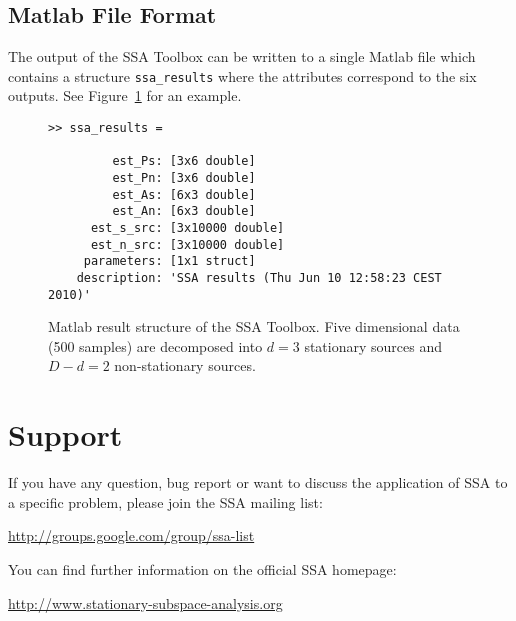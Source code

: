 \documentclass{article}
\newcommand{\1}{\ensuremath{\mathds{1}}}
\newcommand{\0}{\ensuremath{0}}
\begin{document}
\subsection{Matlab File Format}

The output of the SSA Toolbox can be written to a single Matlab file which contains
a structure \texttt{ssa\_results} where the attributes correspond to the six outputs. 
See Figure~\ref{fig:ex_matlab_res} for an example.

\begin{figure}[h]
\centering
\begin{boxedminipage}{12cm}
\begin{verbatim}
>> ssa_results = 

         est_Ps: [3x6 double]
         est_Pn: [3x6 double]
         est_As: [6x3 double]
         est_An: [6x3 double]
      est_s_src: [3x10000 double]
      est_n_src: [3x10000 double]
     parameters: [1x1 struct]
    description: 'SSA results (Thu Jun 10 12:58:23 CEST 2010)'
\end{verbatim}
\end{boxedminipage}
\caption{
Matlab result structure of the SSA Toolbox. Five dimensional data (500 samples) 
are decomposed into $d = 3$ stationary sources and $D-d = 2$ non-stationary sources.
\label{fig:ex_matlab_res}
}
\end{figure}

\section{Support}

If you have any question, bug report or want to discuss the application of SSA
to a specific problem, please join the SSA mailing list:
\begin{center}
        \url{http://groups.google.com/group/ssa-list}
\end{center}
You can find further
information on the official SSA homepage: 
\begin{center}
	\url{http://www.stationary-subspace-analysis.org}
\end{center}
\end{document}
